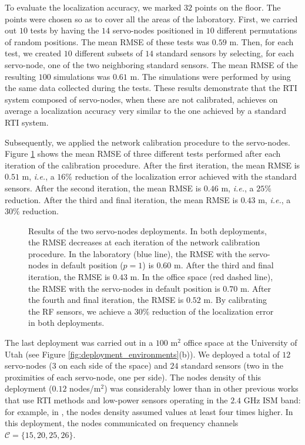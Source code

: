 \documentclass[conference]{IEEEtran}
\begin{document}
To evaluate the localization accuracy, we marked $32$ points on the floor. The points were chosen so as to cover all the areas of the laboratory. First, we carried out $10$ tests by having the $14$ servo-nodes positioned in $10$ different permutations of random positions. The mean RMSE of these tests was $0.59$ m. Then, for each test, we created $10$ different subsets of $14$ standard sensors by selecting, for each servo-node, one of the two neighboring standard sensors. The mean RMSE of the resulting $100$ simulations was $0.61$ m. The simulations were performed by using the same data collected during the tests. These results demonstrate that the RTI system composed of servo-nodes, when these are not calibrated, achieves on average a localization accuracy very similar to the one achieved by a standard RTI system.

Subsequently, we applied the network calibration procedure to the servo-nodes. Figure \ref{fig:servo_nodes_results} shows the mean RMSE of three different tests performed after each iteration of the calibration procedure. After the first iteration, the mean RMSE is $0.51$ m, \emph{i.e.}, a $16\%$ reduction of the localization error achieved with the standard sensors. After the second iteration, the mean RMSE is $0.46$ m, \emph{i.e.}, a $25\%$ reduction. After the third and final iteration, the mean RMSE is $0.43$ m, \emph{i.e.}, a $30\%$ reduction.

\begin{figure}[t]
    \begin{center}
        \caption{Results of the two servo-nodes deployments. In both deployments, the RMSE decreases at each iteration of the network calibration procedure. In the laboratory (blue line), the RMSE with the servo-nodes in default position ($p = 1$) is $0.60$ m. After the third and final iteration, the RMSE is $0.43$ m. In the office space (red dashed line), the RMSE with the servo-nodes in default position is $0.70$ m. After the fourth and final iteration, the RMSE is $0.52$ m. By calibrating the RF sensors, we achieve a $30\%$ reduction of the localization error in both deployments.}
        \label{fig:servo_nodes_results}
    \end{center}
\end{figure}

The last deployment was carried out in a $100$ m$^2$ office space at the University of Utah (see Figure \ref{fig:deployment_environments}(b)). We deployed a total of $12$ servo-nodes ($3$ on each side of the space) and $24$ standard sensors (two in the proximities of each servo-node, one per side). The nodes density of this deployment ($0.12$ nodes/m$^2$) was considerably lower than in other previous works that use RTI methods and low-power sensors operating in the $2.4$ GHz ISM band: for example, in \cite{multi_scale_arxiv,Wilson_SkewL_2011,MASS_2012,Grandma_2012,MTT_2013}, the nodes density assumed values at least four times higher. In this deployment, the nodes communicated on frequency channels $\mathcal{C} = \{15,20,25,26\}$.
\end{document}
